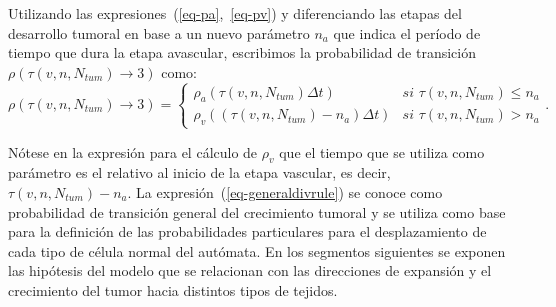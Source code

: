 Utilizando las expresiones~(\ref{eq-pa},~\ref{eq-pv}) y diferenciando las etapas del desarrollo tumoral en base a un nuevo par\'ametro $n_a$ que indica el per\'iodo de tiempo que dura la etapa avascular, escribimos la probabilidad de transici\'on $\rho(\tau(v,n,N_{tum}) \rightarrow 3)$ como:
\begin{equation}
\rho(\tau(v,n,N_{tum}) \rightarrow 3) = \left\lbrace
	\begin{array}{ll}
		\rho_a(\tau(v,n,N_{tum}) \Delta t)& \textit{si } \tau(v,n,N_{tum}) \leq n_a \\
		\rho_v((\tau(v,n,N_{tum})-n_a) \Delta t)& \textit{si } \tau(v,n,N_{tum}) > n_a
	\end{array}
\right.. \label{eq-generaldivrule}
\end{equation}

N\'otese en la expresi\'on para el c\'alculo de $\rho_v$ que el tiempo que se utiliza como par\'ametro es el relativo al inicio de la etapa vascular, es decir, $\tau(v,n,N_{tum})-n_a$. La expresi\'on~(\ref{eq-generaldivrule}) se conoce como probabilidad de transici\'on general del crecimiento tumoral y se utiliza como base para la definici\'on de las probabilidades particulares para el desplazamiento de cada tipo de c\'elula normal del aut\'omata. En los segmentos siguientes se exponen las hip\'otesis del modelo que se relacionan con las direcciones de expansi\'on y el crecimiento del tumor hacia distintos tipos de tejidos.


